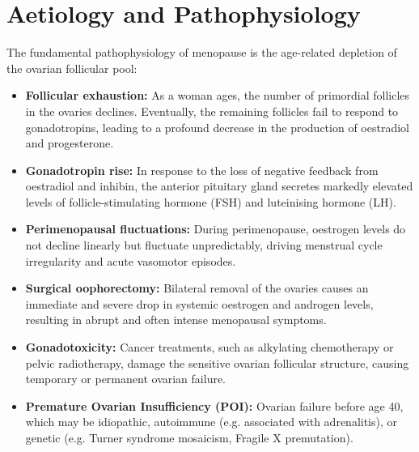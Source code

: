 \section*{Aetiology and Pathophysiology}
The fundamental pathophysiology of menopause is the age-related depletion of the ovarian follicular pool:
\begin{itemize}
    \item \textbf{Follicular exhaustion:} As a woman ages, the number of primordial follicles in the ovaries declines. Eventually, the remaining follicles fail to respond to gonadotropins, leading to a profound decrease in the production of oestradiol and progesterone.
    \item \textbf{Gonadotropin rise:} In response to the loss of negative feedback from oestradiol and inhibin, the anterior pituitary gland secretes markedly elevated levels of follicle-stimulating hormone (FSH) and luteinising hormone (LH).
    \item \textbf{Perimenopausal fluctuations:} During perimenopause, oestrogen levels do not decline linearly but fluctuate unpredictably, driving menstrual cycle irregularity and acute vasomotor episodes.
    \item \textbf{Surgical oophorectomy:} Bilateral removal of the ovaries causes an immediate and severe drop in systemic oestrogen and androgen levels, resulting in abrupt and often intense menopausal symptoms.
    \item \textbf{Gonadotoxicity:} Cancer treatments, such as alkylating chemotherapy or pelvic radiotherapy, damage the sensitive ovarian follicular structure, causing temporary or permanent ovarian failure.
    \item \textbf{Premature Ovarian Insufficiency (POI):} Ovarian failure before age 40, which may be idiopathic, autoimmune (e.g. associated with adrenalitis), or genetic (e.g. Turner syndrome mosaicism, Fragile X premutation).
\end{itemize}


